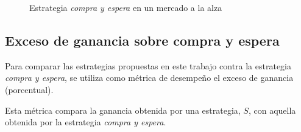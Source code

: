 \documentclass[12pt]{report}
\theoremstyle{break}
\theoremstyle{break}
\begin{document}
\begin{figure}[ht]
\centering
{}
\caption{\label{imagen:buy hold alza} Estrategia \textit{compra y espera} en un mercado a la alza}
\end{figure}

\subsection{Exceso de ganancia sobre compra y espera}
\label{subseccion:exceso de ganancia}

Para comparar las estrategias propuestas en este trabajo contra la estrategia \textit{compra y espera}, se utiliza como métrica de desempeño el exceso de ganancia (porcentual).

Esta métrica compara la ganancia obtenida por una estrategia, $S$, con aquella obtenida por la estrategia \textit{compra y espera}.
\end{document}
